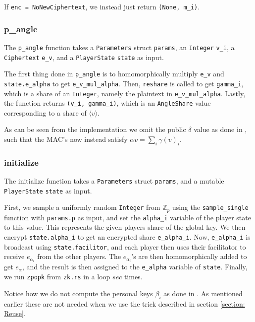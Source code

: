 \documentclass[../main.tex]{subfiles}
\begin{document}
If \lstinline{enc = NoNewCiphertext}, we instead just return \lstinline{(None, m_i)}.

\subsubsection{p\_angle}
The \lstinline{p_angle} function takes a \lstinline{Parameters} struct \lstinline{params}, an \lstinline{Integer} \lstinline{v_i}, a \lstinline{Ciphertext} \lstinline{e_v}, and a \lstinline{PlayerState} \lstinline{state} as input.

The first thing done in \lstinline{p_angle} is to homomorphically multiply \lstinline{e_v} and \lstinline{state.e_alpha} to get \lstinline{e_v_mul_alpha}. Then, \lstinline{reshare} is called to get \lstinline{gamma_i}, which is a share of an \lstinline{Integer}, namely the plaintext in \lstinline{e_v_mul_alpha}. Lastly, the function returns \lstinline{(v_i, gamma_i)}, which is an \lstinline{AngleShare} value corresponding to a share of $\langle v \rangle$.

As can be seen from the implementation we omit the public $\delta$ value as done in \cite{damgaard2013practical}, such that the MAC's now instead satisfy $\alpha v = \sum_i \gamma(v)_i$.
 
\subsubsection{initialize}
The initialize function takes a \lstinline{Parameters} struct \lstinline{params}, and a mutable \lstinline{PlayerState} \lstinline{state} as input.

First, we sample a uniformly random \lstinline{Integer} from $\mathbb{Z}_p$ using the \lstinline{sample_single} function with \lstinline{params.p} as input, and set the \lstinline{alpha_i} variable of the player state to this value. This represents the given players share of the global key. We then encrypt \lstinline{state.alpha_i} to get an encrypted share \lstinline{e_alpha_i}. Now, \lstinline{e_alpha_i} is broadcast using \lstinline{state.facilitor}, and each player then uses their facilitator to receive $e_{\alpha_i}$ from the other players. The $e_{\alpha_i}$'s are then homomorphically added to get $e_\alpha$, and the result is then assigned to the \lstinline{e_alpha} variable of \lstinline{state}. %
Finally, we run \lstinline{zpopk} from \lstinline{zk.rs} in a loop $sec$ times.

Notice how we do not compute the personal keys $\beta_i$ as done in \cite{damgaard2012multiparty}. As mentioned earlier these are not needed when we use the trick described in section \ref{section: Reuse}.
\end{document}
